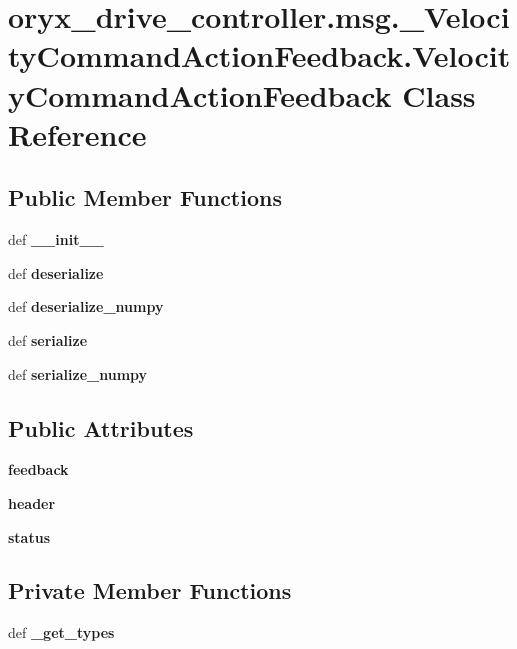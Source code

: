 \section{oryx\-\_\-drive\-\_\-controller.\-msg.\-\_\-\-Velocity\-Command\-Action\-Feedback.\-Velocity\-Command\-Action\-Feedback \-Class \-Reference}
\label{classoryx__drive__controller_1_1msg_1_1__VelocityCommandActionFeedback_1_1VelocityCommandActionFeedback}
\subsection*{\-Public \-Member \-Functions}
\begin{DoxyCompactItemize}
\item 
def {\bf \-\_\-\-\_\-init\-\_\-\-\_\-}
\item 
def {\bf deserialize}
\item 
def {\bf deserialize\-\_\-numpy}
\item 
def {\bf serialize}
\item 
def {\bf serialize\-\_\-numpy}
\end{DoxyCompactItemize}
\subsection*{\-Public \-Attributes}
\begin{DoxyCompactItemize}
\item 
{\bf feedback}
\item 
{\bf header}
\item 
{\bf status}
\end{DoxyCompactItemize}
\subsection*{\-Private \-Member \-Functions}
\begin{DoxyCompactItemize}
\item 
def {\bf \-\_\-get\-\_\-types}
\end{DoxyCompactItemize}
